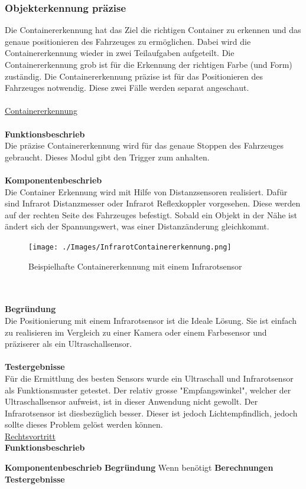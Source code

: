 \subsubsection{Objekterkennung präzise}
Die Containererkennung hat das Ziel die richtigen Container zu erkennen und das genaue positionieren des Fahrzeuges zu ermöglichen. Dabei wird die Containererkennung wieder in zwei Teilaufgaben aufgeteilt. Die Containererkennung grob ist für die Erkennung der richtigen Farbe (und Form) zuständig. Die Containererkennung präzise ist für das Positionieren des Fahrzeuges notwendig. Diese zwei Fälle werden separat angeschaut.\\
\\
\underline{Containererkennung}\\
\\
\textbf{Funktionsbeschrieb}\\
Die präzise Containererkennung wird für das genaue Stoppen des Fahrzeuges gebraucht. Dieses Modul gibt den Trigger zum anhalten.\\
\\
\textbf{Komponentenbeschrieb}\\
Die Container Erkennung wird mit Hilfe von Distanzsensoren realisiert. Dafür sind Infrarot Distanzmesser oder Infrarot Reflexkoppler vorgesehen. Diese werden auf der rechten Seite des Fahrzeuges befestigt. Sobald ein Objekt in der Nähe ist ändert sich der Spannungswert, was einer Distanzänderung gleichkommt. 
\begin{figure} [hbp]
	\centering
	\texttt{[image: ./Images/InfrarotContainererkennung.png]}
	\caption{Beispielhafte Containererkennung mit einem Infrarotsensor}
\end{figure}\\
\\
\textbf{Begründung}
\\
Die Positionierung mit einem Infrarotsensor ist die Ideale Lösung. Sie ist einfach zu realisieren im Vergleich zu einer Kamera oder einem Farbesensor und präziserer als ein Ultraschallsensor.\\
\\
\textbf{Testergebnisse}\\
Für die Ermittlung des besten Sensors wurde ein Ultraschall und Infrarotsensor als Funktionsmuster getestet. Der relativ grosse "Empfangswinkel", welcher der Ultraschallsensor aufweist, ist in dieser Anwendung nicht gewollt. Der Infrarotsensor ist diesbezüglich besser. Dieser ist jedoch Lichtempfindlich, jedoch sollte dieses Problem gelöst werden können.\
\\[0.2cm]
\underline{Rechtsvortritt} \\
\textbf{Funktionsbeschrieb}

\textbf{Komponentenbeschrieb}
\textbf{Begründung}
Wenn benötigt
\textbf{Berechnungen}
\textbf{Testergebnisse}